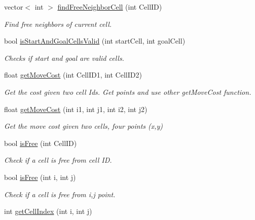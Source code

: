 \begin{DoxyCompactItemize}
vector$<$ int $>$ \hyperlink{class_r_astar__planner_1_1_r_astar_planner_r_o_s_a381bf5111ed9e58aa9dd0c6ff08c34a9}{find\+Free\+Neighbor\+Cell} (int Cell\+ID)
\begin{DoxyCompactList}\small\item\em Find free neighbors of current cell. \end{DoxyCompactList}\item 
bool \hyperlink{class_r_astar__planner_1_1_r_astar_planner_r_o_s_a6c34ac7de619dc756a8598f8e81bfaac}{is\+Start\+And\+Goal\+Cells\+Valid} (int start\+Cell, int goal\+Cell)
\begin{DoxyCompactList}\small\item\em Checks if start and goal are valid cells. \end{DoxyCompactList}\item 
float \hyperlink{class_r_astar__planner_1_1_r_astar_planner_r_o_s_a2835ea7684c39af99ce0f6acdb6b16ac}{get\+Move\+Cost} (int Cell\+I\+D1, int Cell\+I\+D2)
\begin{DoxyCompactList}\small\item\em Get the cost given two cell Ids. Get points and use other get\+Move\+Cost function. \end{DoxyCompactList}\item 
float \hyperlink{class_r_astar__planner_1_1_r_astar_planner_r_o_s_adf21053b27e33f30df2dea62f910481c}{get\+Move\+Cost} (int i1, int j1, int i2, int j2)
\begin{DoxyCompactList}\small\item\em Get the move cost given two cells, four points (x,y) \end{DoxyCompactList}\item 
bool \hyperlink{class_r_astar__planner_1_1_r_astar_planner_r_o_s_a2993e43fb09446c21df27735986e13c1}{is\+Free} (int Cell\+ID)
\begin{DoxyCompactList}\small\item\em Check if a cell is free from cell ID. \end{DoxyCompactList}\item 
bool \hyperlink{class_r_astar__planner_1_1_r_astar_planner_r_o_s_a1648d66652edcba3b73284af7f5b7c18}{is\+Free} (int i, int j)
\begin{DoxyCompactList}\small\item\em Check if a cell is free from i,j point. \end{DoxyCompactList}\item 
int \hyperlink{class_r_astar__planner_1_1_r_astar_planner_r_o_s_ade7b3d65aa5e97588a58e968852cc279}{get\+Cell\+Index} (int i, int j)

\end{DoxyCompactItemize}
